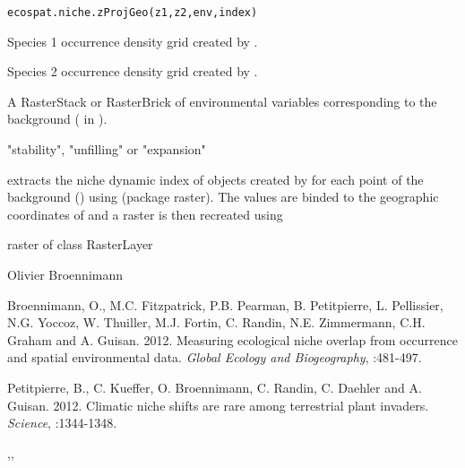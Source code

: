 \documentclass[a4paper]{book}
\begin{document}
%
\begin{Usage}
\begin{verbatim}
ecospat.niche.zProjGeo(z1,z2,env,index)
\end{verbatim}
\end{Usage}
%
\begin{Arguments}
\begin{ldescription}
\item[\code{z1}] Species 1 occurrence density grid created by .
\item[\code{z2}] Species 2 occurrence density grid created by .
\item[\code{env}] A RasterStack or RasterBrick of environmental variables corresponding to the background ( in ).
\item[\code{index}] "stability", "unfilling" or "expansion"
\end{ldescription}
\end{Arguments}
%
\begin{Details}\relax
extracts the niche dynamic index of objects created by  for each point of the background () using  (package raster). The values are binded to the geographic coordinates of  and a raster is then recreated using 
\end{Details}
%
\begin{Value}
raster of class RasterLayer
\end{Value}
%
\begin{Author}\relax
Olivier Broennimann 
\end{Author}
%
\begin{References}\relax
Broennimann, O., M.C. Fitzpatrick, P.B. Pearman, B. Petitpierre, L. Pellissier, N.G. Yoccoz, W. Thuiller, M.J. Fortin, C. Randin, N.E. Zimmermann, C.H. Graham and A. Guisan. 2012. Measuring ecological niche overlap from occurrence and spatial environmental data. \emph{Global Ecology and Biogeography}, :481-497.


Petitpierre, B., C. Kueffer, O. Broennimann, C. Randin, C. Daehler and A. Guisan. 2012. Climatic niche shifts are rare among terrestrial plant invaders. \emph{Science}, :1344-1348.
\end{References}
%
\begin{SeeAlso}\relax
{},, 
\end{SeeAlso}
\end{document}
